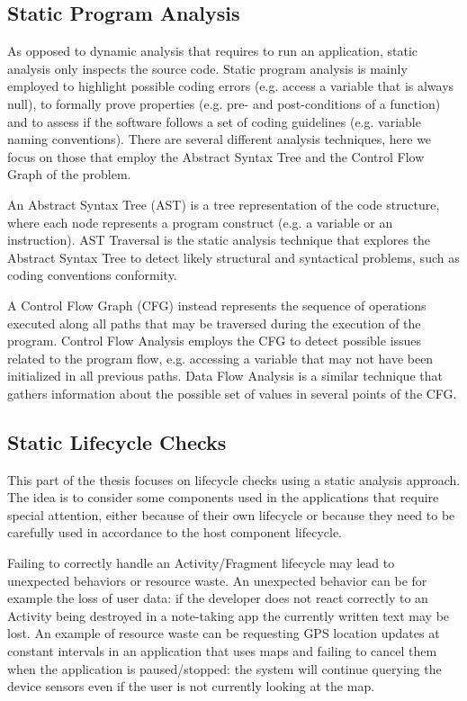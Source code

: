 \documentclass[11pt,a4paper,notitlepage]{article}
\begin{document}
\subsection{Static Program Analysis}
As opposed to dynamic analysis that requires to run an application, static analysis only inspects the source code. Static program analysis is mainly employed to highlight possible coding errors (e.g. access a variable that is always null), to formally prove properties (e.g. pre- and post-conditions of a function) and to assess if the software follows a set of coding guidelines (e.g. variable naming conventions). There are several different analysis techniques, here we focus on those that employ the Abstract Syntax Tree and the Control Flow Graph of the problem.

An Abstract Syntax Tree (AST) is a tree representation of the code structure, where each node represents a program construct (e.g. a variable or an instruction). AST Traversal is the static analysis technique that explores the Abstract Syntax Tree to detect likely structural and syntactical problems, such as coding conventions conformity.

A Control Flow Graph (CFG) instead represents the sequence of operations executed along all paths that may be traversed during the execution of the program. Control Flow Analysis employs the CFG to detect possible issues related to the program flow, e.g. accessing a variable that may not have been initialized in all previous paths. Data Flow Analysis is a similar technique that gathers information about the possible set of values in several points of the CFG.

\subsection{Static Lifecycle Checks}
This part of the thesis focuses on lifecycle checks using a static analysis approach. The idea is to consider some components used in the applications that require special attention, either because of their own lifecycle or because they need to be carefully used in accordance to the host component lifecycle.

Failing to correctly handle an Activity/Fragment lifecycle may lead to unexpected behaviors or resource waste. An unexpected behavior can be for example the loss of user data: if the developer does not react correctly to an Activity being destroyed in a note-taking app the currently written text may be lost. An example of resource waste can be requesting GPS location updates at constant intervals in an application that uses maps and failing to cancel them when the application is paused/stopped: the system will continue querying the device sensors even if the user is not currently looking at the map.
\end{document}
